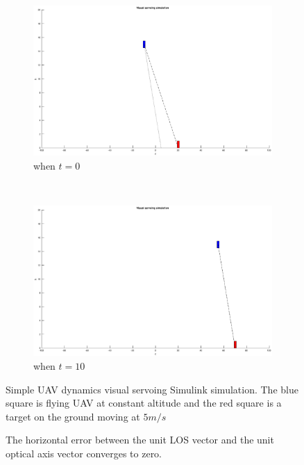 \begin{figure}
	\centering
	\begin{subfigure}[b]{0.45\textwidth}
		\includegraphics[width=\textwidth]{images/simple_zero}
		\caption{when $t=0$}
	\end{subfigure}
	~ %
	\begin{subfigure}[b]{0.45\textwidth}
		\includegraphics[width=\textwidth]{images/simple_ten}
		\caption{when $t=10$}
	\end{subfigure}
	\caption{Simple UAV dynamics visual servoing Simulink simulation. The blue square is flying UAV at constant altitude and the red square is a target on the ground moving at $5m/s$}\label{fig:animals}
	\label{simple_simulation}
\end{figure}
\begin{figure}[thpb]
	\centering
	\caption{The horizontal error between the unit LOS vector and the unit optical axis vector converges to zero.}
	\label{simple_ex}
\end{figure}

